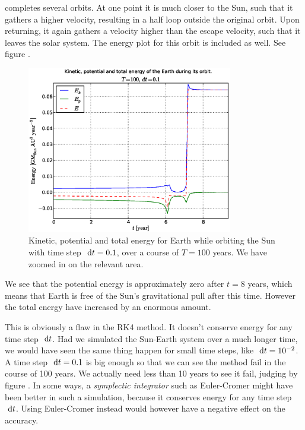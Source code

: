 completes several orbits. At one point it is much closer to the Sun, such
that it gathers a higher velocity, resulting in a half loop outside the original
orbit. Upon returning, it again gathers a velocity higher than the escape
velocity, such that it leaves the solar system. The energy plot for this orbit
is included as well. See figure .
%
\begin{figure}[htpb]
	\centering
	\includegraphics[width=0.8\textwidth]{figures/earth_energy_dt1e-1}
	\caption{Kinetic, potential and total energy for Earth while orbiting the
	Sun with time step $\ \mathrm{d}t = 0.1$, over a course of $T = 100$ years.
	We have zoomed in on the relevant area.}
	\label{fig:energyconstdt0.1}
\end{figure}
%
We see that the potential energy is approximately zero after $t = 8$ years,
which means that Earth is free of the Sun's gravitational pull after this
time. However the total energy have increased by an enormous amount.

This is obviously a flaw in the RK4 method. It doesn't conserve energy for any
time step $\ \mathrm{d}t$. Had we simulated the Sun-Earth system over a much longer time,
we would have seen the same thing happen for small time steps, like $\ \mathrm{d}t =
10^{-2}$. 
A time step $\ \mathrm{d}t = 0.1$ is big enough so that we can see the
method fail in the course of 100 years. We actually need less than 10 years
to see it fail, judging by figure . 
In some ways, a \emph{symplectic integrator} such as Euler-Cromer might have 
been better in such a simulation, because it conserves energy for any time step
$\ \mathrm{d}t$. Using Euler-Cromer instead would however have a negative effect on the
accuracy.

